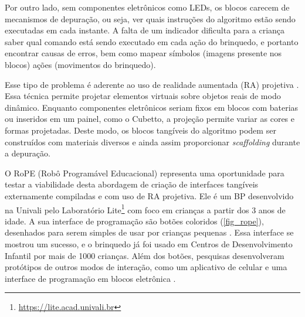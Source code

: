 
Por outro lado, sem componentes eletrônicos como LEDs, os blocos carecem de mecanismos de depuração, ou seja, ver quais instruções do algoritmo estão sendo executadas em cada instante. A falta de um indicador dificulta para a criança saber qual comando está sendo executado em cada ação do brinquedo, e portanto encontrar causas de erros, bem como mapear símbolos (imagens presente nos blocos) ações (movimentos do brinquedo).

Esse tipo de problema é aderente ao uso de realidade aumentada (RA) projetiva \cite{roberto_dynamic_2013}. Essa técnica permite projetar elementos virtuais sobre objetos reais de modo dinâmico. Enquanto componentes eletrônicos seriam fixos em blocos com baterias ou inseridos em um painel, como o Cubetto, a projeção permite variar as cores e formas projetadas. Deste modo, os blocos tangíveis do algoritmo podem ser construídos com materiais diversos e ainda assim proporcionar \textit{scaffolding} durante a depuração.

O RoPE (Robô Programável Educacional) representa uma oportunidade para testar a viabilidade desta abordagem de criação de interfaces tangíveis externamente compiladas e com uso de RA projetiva. Ele é um BP desenvolvido na Univali pelo Laboratório Lite\footnote{\url{https://lite.acad.univali.br}} com foco em crianças a partir dos 3 anos de idade. A sua interface de programação são botões coloridos (\autoref{fig_rope}), desenhados para serem simples de usar por crianças pequenas \cite{raabe_2017_rope}. Essa interface se mostrou um sucesso, e o brinquedo já foi usado em Centros de Desenvolvimento Infantil por mais de 1000 crianças. Além dos botões, pesquisas desenvolveram protótipos de outros modos de interação, como um aplicativo de celular \cite{viana_cesar_interface_2018} e uma interface de programação em blocos eletrônica \cite{metzger_desenvolvimento_2018}.


